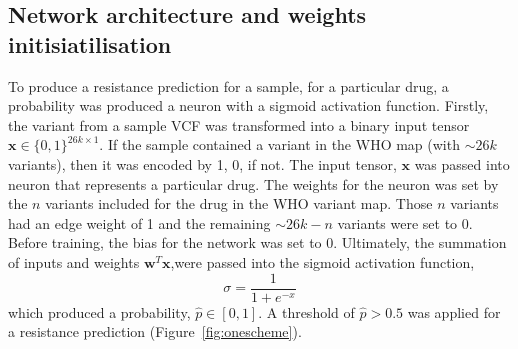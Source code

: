 \subsection{Network architecture and weights initisiatilisation}
To produce a resistance prediction for a sample, for a particular drug, a probability was produced a neuron with a sigmoid activation function. Firstly, the variant from a sample VCF was transformed into a binary input tensor $\mathbf{x} \in \{0,1\}^{26k\times1}$. If the sample contained a variant in the WHO map (with $\sim26k$ variants), then it was encoded by 1, 0, if not. The input tensor, $\mathbf{x}$ was passed into neuron that represents a particular drug. The weights for the neuron was set by the $n$ variants included for the drug in the WHO variant map. Those $n$ variants had an edge weight of 1 and the remaining $\sim26k-n $ variants were set to 0. Before training, the bias for the network was set to 0. Ultimately, the summation of inputs and weights $\mathbf{w}^{T}\mathbf{x}$,were passed into the sigmoid activation function, $$\sigma = \frac{1}{1+e^{-x}}$$ which produced a probability, $\hat{p} \in [0,1]$. A threshold of $\hat{p} > 0.5$ was applied for a resistance prediction (Figure~\ref{fig:onescheme}). 


